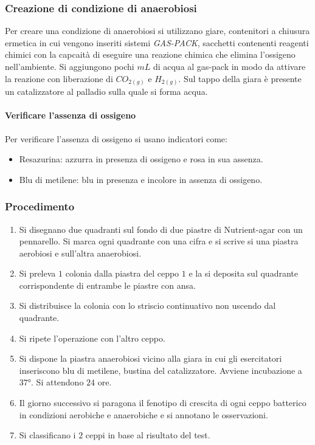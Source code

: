 		\subsubsection{Creazione di condizione di anaerobiosi}
		Per creare una condizione di anaerobiosi si utilizzano giare, contenitori a chiusura ermetica in cui vengono inseriti sistemi \emph{GAS-PACK}, sacchetti contenenti reagenti chimici con la capcait\`a di eseguire una reazione chimica che elimina l'ossigeno nell'ambiente.
		Si aggiungono pochi $\si{mL}$ di acqua al gas-pack in modo da attivare la reazione con liberazione di \emph{$CO_{2(g)}$} e \emph{$H_{2(g)}$}.
		Sul tappo della giara \`e presente un catalizzatore al palladio sulla quale si forma acqua.
		
			\paragraph{Verificare l'assenza di ossigeno}
			Per verificare l'assenza di ossigeno si usano indicatori come:
			\begin{itemize}
				\item Resazurina: azzurra in presenza di ossigeno e rosa in sua assenza.
				\item Blu di metilene: blu in presenza e incolore in assenza di ossigeno.
			\end{itemize}

		\subsubsection{Procedimento}
		\begin{enumerate}
			\item Si disegnano due quadranti sul fondo di due piastre di Nutrient-agar con un pennarello.
				Si marca ogni quadrante con una cifra e si scrive si una piastra aerobiosi e sull'altra anaerobiosi.
			\item Si preleva $1$ colonia dalla piastra del ceppo $1$ e la si deposita sul quadrante corrispondente di entrambe le piastre con ansa.
			\item Si distribuisce la colonia con lo striscio continuativo non uscendo dal quadrante.
			\item Si ripete l'operazione con l'altro ceppo. 
			\item Si dispone la piastra anaerobiosi vicino alla giara in cui gli esercitatori inseriscono blu di metilene, bustina del catalizzatore.
				Avviene incubazione a $37\si{\degree}$.
				Si attendono $24$ ore.
			\item Il giorno successivo si paragona il fenotipo di crescita di ogni ceppo batterico in condizioni aerobiche e anaerobiche e si annotano le osservazioni.
			\item Si classificano i $2$ ceppi in base al risultato del test.
		\end{enumerate}
		
